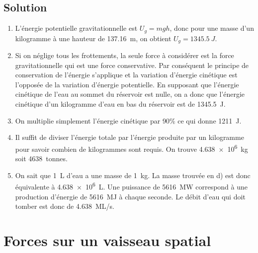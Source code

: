 \documentclass[nofonts]{tufte-handout}
\begin{document}
\subsection{Solution}
\begin{enumerate}[label=\alph*)]
  \item L'énergie potentielle gravitationnelle est $U_g = mgh$, donc pour une
    masse d'un kilogramme à une hauteur de \qty{137.16}{m}, on obtient $U_g =
    \qty{1345.5}{J}$.
  \item Si on néglige tous les frottements, la seule force à considérer est la
    force gravitationnelle qui est une force conservative. Par conséquent le
    principe de conservation de l'énergie s'applique et la variation d'énergie
    cinétique est l'opposée de la variation d'énergie potentielle. En supposant
    que l'énergie cinétique de l'eau au sommet du réservoir est nulle, on a donc
    que l'énergie cinétique d'un kilogramme d'eau en bas du réservoir est de
    \qty{1345.5}{J}.
  \item On multiplie simplement l'énergie cinétique par 90\% ce qui donne
    \qty{1211}{J}.
  \item Il suffit de diviser l'énergie totale par l'énergie produite par un
    kilogramme pour savoir combien de kilogrammes sont requis. On trouve
    \qty{4.638e6}{kg} soit \qty{4638}{tonnes}.
  \item On sait que \qty{1}{L} d'eau a une masse de \qty{1}{kg}. La masse
    trouvée en d) est donc équivalente à \qty{4.638e6}{L}. Une puissance de
    \qty{5616}{MW} correspond à une production d'énergie de \qty{5616}{MJ} à
    chaque seconde. Le débit d'eau qui doit tomber est donc de \qty{4.638}{ML/s}.
\end{enumerate}
\fi


\section{Forces sur un vaisseau spatial}
\end{document}
